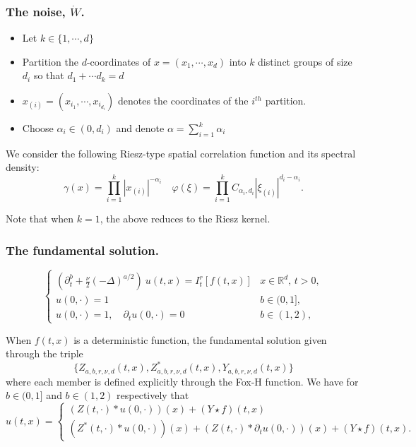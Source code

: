 \documentclass{beamer}
\numberwithin{equation}{section}
\newcommand{\R}{\mathbb{R}}
\begin{document}
	\begin{frame}[t]
		\frametitle{The noise, $\dot{W}$.}
		\begin{itemize}
			\item Let $k \in \{1,\cdots,d\}$
			\item Partition the $d$-coordinates of $x=(x_1,\cdots,x_d)$ into $k$ distinct groups of size $d_i$ so that $d_1 + \cdots d_k =d$
			\item $x_{(i)} = (x_{i_1},\cdots, x_{i_{d_i}})$ denotes the coordinates of the $i^{th}$ partition.
			\item Choose $\alpha_i \in (0,d_i)$ and denote $\alpha = \sum_{i=1}^k\alpha_i$
		\end{itemize}
		
		We consider the following Riesz-type spatial correlation function and its spectral density:
		\[
		\gamma(x) = \prod_{i=1}^k |x_{(i)}|^{-\alpha_i} \quad \varphi(\xi) = \prod_{i=1}^k C_{\alpha_i,d_i} |{\xi}_{(i)}|^{d_i-\alpha_i}.
		\]
		
		Note that when $k=1$, the above reduces to the Riesz kernel. 
	\end{frame}
	
	\begin{frame}[t]
		\frametitle{The fundamental solution.}
		\[
		\begin{cases}
		\left(\partial^b_t + \frac{\nu}{2}(-\Delta)^{a/2}\right)\: u(t,x) = I^r_t \left[f(t,x)\right] & \text{$x\in \R^d$, $t>0$}, \\
		u(0,\cdot) = 1                                                                                                             & b \in (0,1],               \\
		u(0,\cdot) = 1, \quad \partial_t u(0,\cdot) = 0                                                                            & b \in (1,2),
		\end{cases}
		\]
		
		When $f(t,x)$ is a deterministic function, the fundamental solution given through the triple 
		\[
		\{ Z_{a,b,r,\nu,d}(t,x),   Z^*_{a,b,r,\nu,d}(t,x), Y_{a,b,r,\nu,d}(t,x)\}
		\]
		where each member is defined explicitly through the Fox-H function. We have for $b \in (0,1]$ and $b \in (1,2)$ respectively that
		\[ u(t,x) = 
		\begin{cases}
		(Z(t,\cdot)*u(0,\cdot))(x) + (Y\star f)(t,x)
		\\ 	(Z^*(t,\cdot)*u(0,\cdot))(x) + (Z(t,\cdot)*\partial_tu(0,\cdot))(x) + (Y\star f)(t,x).
		\end{cases}
		\]
		
		
	\end{frame}
	
\end{document}
